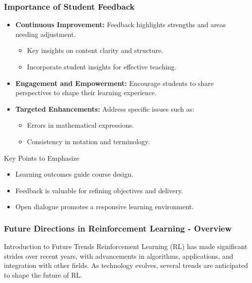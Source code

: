 \documentclass[aspectratio=169]{beamer}
\begin{document}
\begin{frame}[fragile]
    \frametitle{Importance of Student Feedback}
    \begin{itemize}
        \item \textbf{Continuous Improvement:} 
        Feedback highlights strengths and areas needing adjustment.
        \begin{itemize}
            \item Key insights on content clarity and structure.
            \item Incorporate student insights for effective teaching.
        \end{itemize}
        
        \item \textbf{Engagement and Empowerment:} 
        Encourage students to share perspectives to shape their learning experience.
        
        \item \textbf{Targeted Enhancements:} 
        Address specific issues such as:
        \begin{itemize}
            \item Errors in mathematical expressions.
            \item Consistency in notation and terminology.
        \end{itemize}
    \end{itemize}

    \begin{block}{Key Points to Emphasize}
        \begin{itemize}
            \item Learning outcomes guide course design.
            \item Feedback is valuable for refining objectives and delivery.
            \item Open dialogue promotes a responsive learning environment.
        \end{itemize}
    \end{block}
\end{frame}

\begin{frame}[fragile]
    \frametitle{Future Directions in Reinforcement Learning - Overview}
    \begin{block}{Introduction to Future Trends}
        Reinforcement Learning (RL) has made significant strides over recent years, with advancements in algorithms, applications, and integration with other fields. As technology evolves, several trends are anticipated to shape the future of RL.
    \end{block}
\end{frame}
\end{document}
